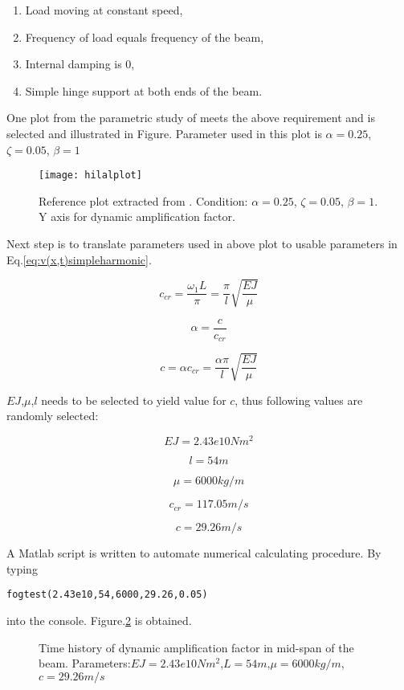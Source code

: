 \begin{enumerate}
    \item Load moving at constant speed,
    \item Frequency of load equals frequency of the beam,
    \item Internal damping is 0,
    \item Simple hinge support at both ends of the beam.
\end{enumerate}

One plot from the parametric study of \citet{abu2000vibration} meets the above requirement and is selected and illustrated in Figure. Parameter used in this plot is $\alpha = 0.25$, $\zeta = 0.05$, $\beta  = 1$

\begin{figure}[h!]
    \centering
    \texttt{[image: hilalplot]}
    \caption{Reference plot extracted from \citet{abu2000vibration}. Condition: $\alpha = 0.25$, $\zeta = 0.05$, $\beta  = 1$. Y axis for dynamic amplification factor.}
    \label{fig:hilalplot}
\end{figure}

Next step is to translate parameters used in above plot to usable parameters in Eq.\ref{eq:v(x,t)simpleharmonic}.


$$c_{cr} = \frac{\omega_1 L}{\pi} = \frac{\pi}{l}\sqrt{\frac{EJ}{\mu}}$$

$$\alpha = \frac{c}{c_{cr}}$$

$$c = \alpha c_{cr} = \frac{\alpha\pi}{l}\sqrt{\frac{EJ}{\mu}}$$

$EJ$,$\mu$,$l$ needs to be selected to yield value for $c$, thus following values are randomly selected:

$$EJ = 2.43e10 Nm^2$$

$$l = 54m$$

$$\mu = 6000 kg/m$$

$$c_{cr} = 117.05 m/s$$

$$ c = 29.26 m/s $$

A Matlab script is written to automate numerical calculating procedure. By typing 

\texttt{fogtest(2.43e10,54,6000,29.26,0.05)}

into the console. Figure.\ref{fig:EJ24300000000L54mu6000c29daf.tikz} is obtained.

\begin{figure}[h!]
\centering 
\newlength\figureheight 
\newlength\figurewidth 
\setlength\figureheight{6cm} 
\setlength\figurewidth{6cm} 
 
\caption{Time history of dynamic amplification factor in mid-span of the beam. Parameters:$EJ=2.43e10Nm^2$,$L=54m$,$\mu=6000kg/m$,$c=29.26m/s$} 
\label{fig:EJ24300000000L54mu6000c29daf.tikz} 
\end{figure}

